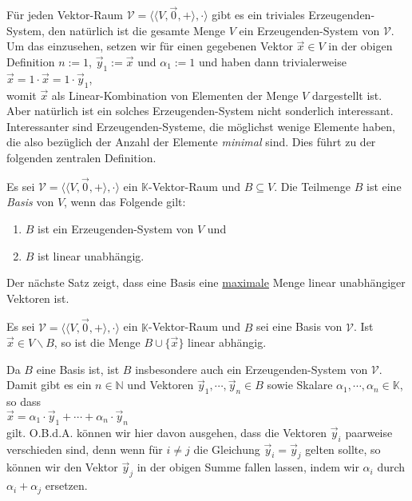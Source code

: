 F\"{u}r jeden Vektor-Raum $\mathcal{V} = \bigl\langle \langle V, \vec{0}, + \rangle, \cdot \bigr\rangle$ 
gibt es ein triviales Erzeugenden-System, den nat\"{u}rlich ist die gesamte 
Menge $V$ ein Erzeugenden-System von $\mathcal{V}$.  Um das einzusehen, setzen wir f\"{u}r einen gegebenen Vektor
$\vec{x} \in V$ in der obigen Definition $n:=1$, $\vec{y}_1 := \vec{x}$ und $\alpha_1 := 1$
und haben dann trivialerweise
\\[0.2cm]
\hspace*{1.3cm}
$\vec{x} = 1 \cdot \vec{x} = 1 \cdot \vec{y}_1$,
\\[0.2cm]
womit $\vec{x}$ als Linear-Kombination von Elementen der Menge $V$ dargestellt ist.  Aber
nat\"{u}rlich ist ein solches Erzeugenden-System nicht sonderlich interessant.  Interessanter sind
Erzeugenden-Systeme, die m\"{o}glichst wenige Elemente haben, die also bez\"{u}glich der Anzahl
der Elemente \emph{minimal} sind.  Dies f\"{u}hrt zu der folgenden zentralen Definition.
\pagebreak

\begin{Definition}[Basis]
  Es sei $\mathcal{V} = \bigl\langle \langle V, \vec{0}, + \rangle, \cdot \bigr\rangle$ ein $\mathbb{K}$-Vektor-Raum 
  und $B \subseteq V$.  Die Teilmenge $B$ ist eine
  \emph{Basis} von $V$, wenn das Folgende gilt:
  \begin{enumerate}
  \item $B$ ist ein Erzeugenden-System von $V$ und
  \item $B$ ist linear unabh\"{a}ngig.  \eoxs
  \end{enumerate}
\end{Definition}

\noindent
Der n\"{a}chste Satz zeigt, dass eine Basis eine \underline{maximale} Menge linear unabh\"{a}ngiger Vektoren ist.

\begin{Satz}
  Es sei $\mathcal{V} = \bigl\langle \langle V, \vec{0}, + \rangle, \cdot \bigr\rangle$ 
  ein $\mathbb{K}$-Vektor-Raum und $B$ sei eine Basis von $\mathcal{V}$.  Ist $\vec{x} \in V \backslash B$,
  so ist die Menge $B \cup \{ \vec{x} \}$ linear abh\"{a}ngig.
\end{Satz}

\proof
Da $B$ eine Basis ist, ist $B$ insbesondere auch ein Erzeugenden-System von $\mathcal{V}$.  Damit gibt es ein
$n \in \mathbb{N}$ und Vektoren $\vec{y}_1,\cdots,\vec{y}_n \in B$ sowie Skalare $\alpha_1, \cdots,\alpha_n \in \mathbb{K}$,
so dass
\\[0.2cm]
\hspace*{1.3cm}
$\vec{x} = \alpha_1 \cdot \vec{y}_1 + \cdots + \alpha_n \cdot \vec{y}_n$
\\[0.2cm]
gilt.  O.B.d.A. k\"{o}nnen wir hier davon ausgehen, dass die Vektoren $\vec{y}_i$ paarweise
verschieden sind, denn wenn f\"{u}r $i\not= j$ die Gleichung $\vec{y}_i = \vec{y}_j$
gelten sollte, so k\"{o}nnen wir den Vektor $\vec{y}_j$ in der obigen Summe fallen lassen,
indem wir $\alpha_i$ durch $\alpha_i + \alpha_j$ ersetzen.

